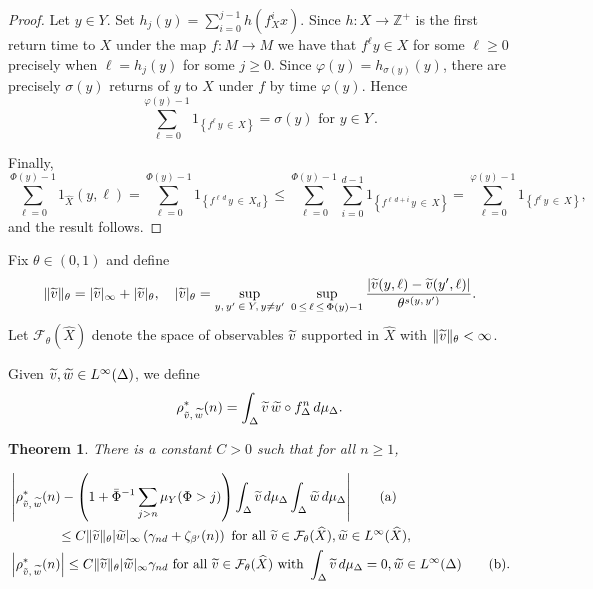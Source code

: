 \documentclass[10pt]{amsart}
\newtheorem{theo}{Theorem}[section]
\theoremstyle{definition}\newtheorem{defi}[theo]{Definition}\newtheorem{rema}[theo]{Remark}\newtheorem{exam}[theo]{Example}\newtheorem{exem}[theo]{Example}\newtheorem{nota}[theo]{Notation}
\newcommand{\Z}{\mathbb{Z}}
\newcommand{\cF}{\mathcal{F}}
\newcommand{\hX}{\widehat{X}}
\newcommand{\tw}{\widetilde{w}}
\newcommand{\tv}{\tilde{v}}
\newcommand{\bPhi}{\bar{\Phi}}
\let\oldtilde\tilde
\renewcommand*{\tilde}[1]{\mathchoice{\widetilde{#1}}{\widetilde{#1}}{\oldtilde{#1}}{\oldtilde{#1}}}
\begin{document}
\begin{proof}
Let $y\in Y$. Set $h_j(y)=\sum_{i=0}^{j-1}h(f_X^ix)$. Since $h:X\to\Z^+$ is the first return time to $X$ under the map $f:M\to M$ we have that $f^\ell y\in X$ for some $\ell\ge 0$ precisely when $\ell=h_j(y)$ for some $j\ge0$. Since $\varphi(y)=h_{\sigma(y)}(y)$, there are precisely $\sigma(y)$ returns of $y$ to $X$ under $f$ by time $\varphi(y)$. Hence
\[
\sum_{\ell=0}^{\varphi(y)-1}1_{\left\{f^\ell\,y\,\in\,X\right\}} = \sigma(y)\text{ for }y\in Y\,.
\]

Finally,
\[
\sum_{\ell=0}^{\Phi(y)-1}1_{\hX}(y,\ell) =
\sum_{\ell=0}^{\Phi(y)-1}1_{\left\{f^{\ell\,d}\,y\,\in\,X_d\right\}}
\le \sum_{\ell=0}^{\Phi(y)-1}\sum_{i=0}^{d-1}1_{\left\{f^{\ell\,d+i}\,y\,\in\,X\right\}} =\sum_{\ell=0}^{\varphi(y)-1}1_{\left\{f^\ell\,y\,\in\, X\right\}},
\]
and the result follows.
\end{proof}


Fix $\theta\in(0,1)$ and define
\begin{equation}\label{eq:norm1}
\|\tv\|_\theta=|\tv|_\infty+|\tv|_\theta, \quad |\tv|_\theta =\sup_{y,\,y'\:\in\:Y,\,y\neq y'}\;\sup_{0\,\le\,\ell\,\le \,\Phi(y)-1}\frac{|\tv(y,\ell)-\tv(y',\ell)|}{\theta^{s(y,\,y')}}.
\end{equation}
Let $\cF_\theta(\hX)$ denote the space of observables $\tv$ supported in $\hX$ with $\|\tv\|_\theta<\infty$.

Given $\tv,\tw\in L^\infty(\Delta)$, we define
\[
\rho^*_{\tv,\,\tw}(n)= \int_\Delta\tv\,\tw\circ f_\Delta^n\,d\mu_\Delta.
\]

\begin{theo} \label{thm:Delta}
There is a constant $C>0$ such that for all $n\ge1$,

\begin{align}
&\left|\rho^*_{\tv,\,\tw}(n)-\left(1+\bPhi^{-1}\sum_{j>n} \mu_Y(\Phi>j)\right)\int_\Delta\tv\,d\mu_\Delta\int_\Delta\tw\,d\mu_\Delta\right|\tag{${\rm a}$}\label{theo4.2.1}\\
&\mkern65mu\le C\|\tv\|_\theta|\tw|_\infty\left(\gamma_{nd}+\zeta_{\beta'}(n)\right)\text{ for all }\tv\in \cF_\theta(\hX), \tw\in L^\infty(\hX),\nonumber\\
&\left|\rho^*_{\tv,\,\tw}(n)\right|\le C\|\tv\|_\theta|\tw|_\infty\gamma_{nd}\text{ for all }\tv\in \cF_\theta(\hX)\text{ with }\int_\Delta \tv\,d\mu_\Delta=0, \tw\in L^\infty(\Delta)\tag{${\rm b}$}\label{theo4.2.2}.
\end{align}
\end{theo}
\end{document}
